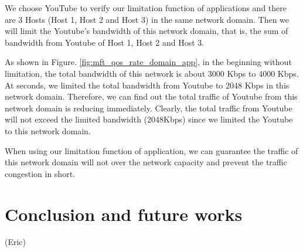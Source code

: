 \documentclass[journal]{IEEEtran}
\begin{document}
We choose YouTube to verify our limitation function of applications and there are 3 Hosts (Host 1, Host 2 and Host 3) in the same network domain. Then we will limit the Youtube’s bandwidth of this network domain, that is, the sum of bandwidth from Youtube of Host 1, Host 2 and Host 3.

As shown in Figure. \ref{fig:mft_qos_rate_domain_app}, in the beginning without limitation, the total bandwidth of this network is about 3000 Kbps to 4000 Kbps. At  seconds, we limited the total bandwidth from Youtube to 2048 Kbps in this network domain. Therefore, we can find out the total traffic of Youtube from this network domain is reducing immediately. Clearly, the total traffic from Youtube will not exceed the limited bandwidth (2048Kbps) since we limited the Youtube to this network domain.

When using our limitation function of application, we can guarantee the traffic of this network domain will not over the network capacity and prevent the traffic congestion in short.



\section{Conclusion and future works}
(Eric)



\newpage


\end{document}

